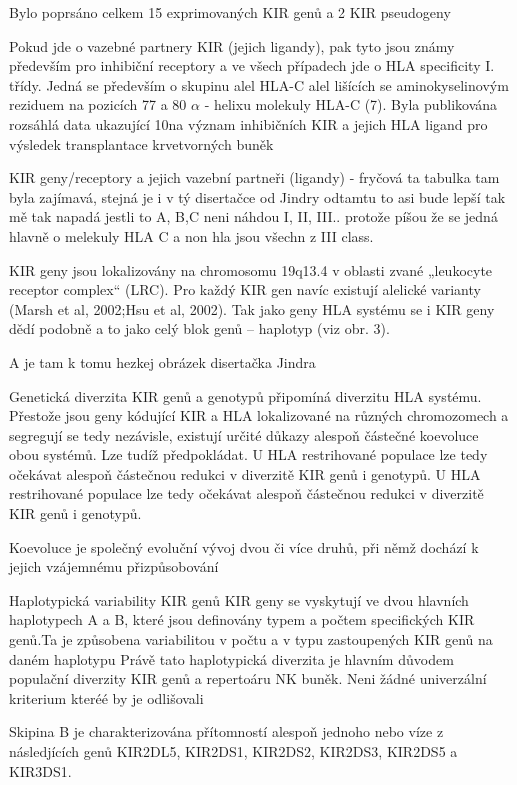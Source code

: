\documentclass[czech,DP]{thesiskiv}
\begin{document}
Bylo poprsáno celkem 15 exprimovaných KIR genů a 2 KIR pseudogeny


Pokud jde o vazebné partnery KIR (jejich ligandy), pak tyto jsou
známy především pro inhibiční receptory a ve všech případech jde o
HLA specificity I. třídy. Jedná se především o skupinu alel HLA-C alel
lišících se aminokyselinovým 
reziduem na pozicích
 77 a 80 $\alpha$
- helixu molekuly HLA-C (7). Byla publikována rozsáhlá data ukazující
10na význam inhibičních KIR a jejich HLA ligand pro výsledek
transplantace krvetvorných buněk

KIR geny/receptory a jejich vazební partneři (ligandy)
- fryčová ta tabulka tam byla zajímavá, stejná je i v tý disertačce od Jindry odtamtu to asi bude lepší
tak mě tak napadá jestli to A, B,C neni náhdou I, II, III.. protože píšou že se jedná hlavně o melekuly HLA C a non hla jsou všechn z III class.


KIR geny jsou lokalizovány na chromosomu 19q13.4 v oblasti zvané „leukocyte receptor
complex“ (LRC). Pro každý KIR gen navíc existují alelické varianty (Marsh et al, 2002;Hsu
et al, 2002). Tak jako geny HLA systému se i KIR geny dědí podobně a to jako celý blok
genů – haplotyp (viz obr. 3).

A je tam k tomu hezkej obrázek disertačka Jindra

Genetická diverzita KIR genů a genotypů připomíná diverzitu HLA
systému. Přestože jsou geny kódující KIR a HLA lokalizované na
různých chromozomech a segregují se tedy nezávisle, existují určité
důkazy alespoň částečné koevoluce obou systémů. Lze tudíž
předpokládat. U HLA restrihované populace lze tedy očekávat
alespoň částečnou redukci v diverzitě KIR genů i genotypů.
U HLA restrihované populace lze tedy očekávat
alespoň částečnou redukci v diverzitě KIR genů i genotypů.

Koevoluce je společný evoluční vývoj dvou či více druhů, při němž dochází k jejich vzájemnému přizpůsobování

Haplotypická variability KIR genů
KIR geny se vyskytují ve dvou hlavních haplotypech A a B, které jsou definovány typem a počtem specifických KIR genů.Ta je způsobena variabilitou v počtu a v typu
zastoupených KIR genů na daném haplotypu
Právě tato
haplotypická diverzita je hlavním důvodem populační diverzity KIR
genů a repertoáru NK buněk.
Neni žádné univerzální kriterium kteréé by je odlišovali

Skipina B je charakterizována přítomností alespoň jednoho nebo víze z následjících genů KIR2DL5, KIR2DS1, KIR2DS2, KIR2DS3, KIR2DS5 a KIR3DS1.
\end{document}
